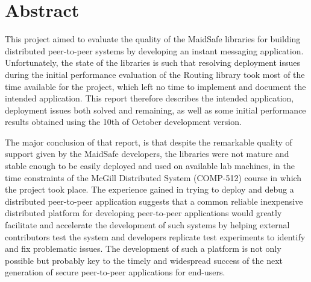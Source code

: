 \chapter*{\centering Abstract}

This project aimed to evaluate the quality of the MaidSafe libraries for building distributed peer-to-peer systems by developing an instant messaging application. Unfortunately, the state of the libraries is such that resolving deployment issues during the initial performance evaluation of the Routing library took most of the time available for the project, which left no time to implement and document the intended application. This report therefore describes the intended application, deployment issues both solved and remaining, as well as some initial performance results obtained using the 10th of October development version. 

The major conclusion of that report, is that despite the remarkable quality of support given by the MaidSafe developers, the libraries were not mature and stable enough to be easily deployed and used on available lab machines, in the time constraints of the McGill Distributed System (COMP-512) course in which the project took place. The experience gained in trying to deploy and debug a distributed peer-to-peer application suggests that a common reliable inexpensive distributed platform for developing peer-to-peer applications would greatly facilitate and accelerate the development of such systems by helping external contributors test the system and developers replicate test experiments to identify and fix problematic issues. The development of such a platform is not only possible but probably key to the timely and widespread success of the next generation of secure peer-to-peer applications for end-users.